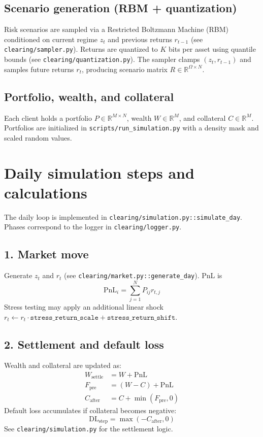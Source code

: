 \documentclass[11pt]{article}
\begin{document}
\subsection{Scenario generation (RBM + quantization)}
Risk scenarios are sampled via a Restricted Boltzmann Machine (RBM) conditioned on
current regime $z_t$ and previous returns $r_{t-1}$ (see
\texttt{clearing/sampler.py}). Returns are quantized to $K$ bits per asset using
quantile bounds (see \texttt{clearing/quantization.py}). The sampler clamps
$(z_t, r_{t-1})$ and samples future returns $r_t$, producing scenario matrix
$R \in \mathbb{R}^{\Omega \times N}$.

\subsection{Portfolio, wealth, and collateral}
Each client holds a portfolio $P \in \mathbb{R}^{M \times N}$, wealth $W \in
\mathbb{R}^M$, and collateral $C \in \mathbb{R}^M$. Portfolios are initialized in
\texttt{scripts/run\_simulation.py} with a density mask and scaled random values.

\section{Daily simulation steps and calculations}
The daily loop is implemented in \texttt{clearing/simulation.py::simulate\_day}.
Phases correspond to the logger in \texttt{clearing/logger.py}.

\subsection{1. Market move}
Generate $z_t$ and $r_t$ (see \texttt{clearing/market.py::generate\_day}). PnL is
\[
\text{PnL}_i = \sum_{j=1}^N P_{ij} r_{t,j}
\]
Stress testing may apply an additional linear shock
$r_t \leftarrow r_t \cdot \texttt{stress\_return\_scale} + \texttt{stress\_return\_shift}$.

\subsection{2. Settlement and default loss}
Wealth and collateral are updated as:
\begin{align*}
W_{\text{settle}} &= W + \text{PnL} \\
F_{\text{pre}} &= (W - C) + \text{PnL} \\
C_{\text{after}} &= C + \min(F_{\text{pre}}, 0)
\end{align*}
Default loss accumulates if collateral becomes negative:
\[
\text{DL}_{\text{step}} = \max(-C_{\text{after}}, 0)
\]
See \texttt{clearing/simulation.py} for the settlement logic.
\end{document}
